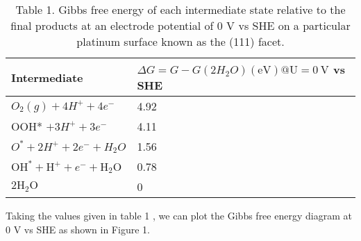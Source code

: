 \documentclass[12pt]{article}
\begin{document}
\begin{table}[h]
\begin{center}
\caption{Table 1. Gibbs free energy of each intermediate state relative to the final products at an electrode potential of 0 V vs SHE on a particular platinum surface known as the (111) facet.}
\begin{tabular}{|l|l|}
\hline
Intermediate & $\Delta G=G-G\left(2 H_{2} O\right)(\mathrm{eV}) @ \mathrm{U}=0 \mathrm{~V}$ vs SHE \\
\hline
$O_{2}(g)+4 H^{+}+4 e^{-}$ & 4.92 \\
\hline
OOH* $+3 H^{+}+3 e^{-}$ & 4.11 \\
\hline
$O^{*}+2 H^{+}+2 e^{-}+H_{2} O$ & 1.56 \\
\hline
$\mathrm{OH}^{*}+\mathrm{H}^{+}+e^{-}+\mathrm{H}_{2} \mathrm{O}$ & 0.78 \\
\hline
$2 \mathrm{H}_{2} \mathrm{O}$ & 0 \\
\hline
\end{tabular}
\end{center}
\end{table}

Taking the values given in table 1 , we can plot the Gibbs free energy diagram at 0 V vs SHE as shown in Figure 1.
\end{document}
